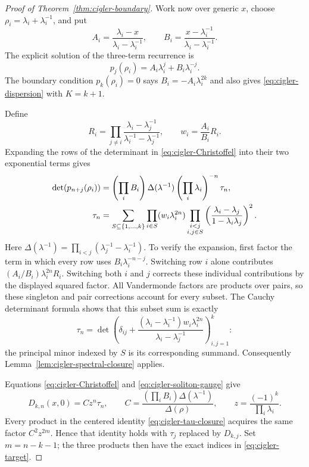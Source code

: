 \documentclass[11pt,a4paper]{article}
\theoremstyle{definition}\newtheorem{definition}[theorem]{Definition}
\theoremstyle{remark}\newtheorem{remark}[theorem]{Remark}
\begin{document}
\begin{proof}[Proof of Theorem~\ref{thm:cigler-boundary}]
Work now over generic $x$, choose
$\rho_i=\lambda_i+\lambda_i^{-1}$, and put
\[
 A_i=\frac{\lambda_i-x}{\lambda_i-\lambda_i^{-1}},\qquad
 B_i=\frac{x-\lambda_i^{-1}}{\lambda_i-\lambda_i^{-1}}.
\]
The explicit solution of the three-term recurrence is
\[
 p_j(\rho_i)=A_i\lambda_i^j+B_i\lambda_i^{-j}.
\]
The boundary condition $p_k(\rho_i)=0$ says
$B_i=-A_i\lambda_i^{2k}$ and also gives
\eqref{eq:cigler-dispersion} with $K=k+1$.

Define
\[
 R_i=\prod_{j\ne i}
       \frac{\lambda_i-\lambda_j^{-1}}
            {\lambda_i^{-1}-\lambda_j^{-1}},
 \qquad w_i=\frac{A_i}{B_i}R_i.
\]
Expanding the rows of the determinant in \eqref{eq:cigler-Christoffel}
into their two exponential terms gives
\begin{align}
 \det(p_{n+j}(\rho_i))
 &=\left(\prod_i B_i\right)\Delta(\lambda^{-1})
                    \left(\prod_i\lambda_i\right)^{-n}\tau_n,
 \label{eq:cigler-soliton-gauge}\\
 \tau_n
 &=\sum_{S\subseteq\{1,\ldots,k\}}
       \prod_{i\in S}(w_i\lambda_i^{2n})
       \prod_{\substack{i<j\\i,j\in S}}
          \left(\frac{\lambda_i-\lambda_j}{1-\lambda_i\lambda_j}\right)^2.
 \notag
\end{align}
Here $\Delta(\lambda^{-1})=\prod_{i<j}(\lambda_j^{-1}-\lambda_i^{-1})$.
To verify the expansion, first factor the term in which every row uses
$B_i\lambda_i^{-n-j}$. Switching row $i$ alone contributes
$(A_i/B_i)\lambda_i^{2n}R_i$. Switching both $i$ and $j$ corrects
these individual contributions by the displayed squared factor.
All Vandermonde factors are products over pairs, so these singleton and
pair corrections account for every subset.
The Cauchy determinant formula shows that this subset sum is exactly
\[
 \tau_n=\det\left(\delta_{ij}
       +\frac{(\lambda_i-\lambda_i^{-1})w_i\lambda_i^{2n}}
                    {\lambda_i-\lambda_j^{-1}}\right)_{i,j=1}^k:
\]
the principal minor indexed by $S$ is its corresponding summand.
Consequently Lemma~\ref{lem:cigler-spectral-closure} applies.

Equations \eqref{eq:cigler-Christoffel} and
\eqref{eq:cigler-soliton-gauge} give
\[
 D_{k,n}(x,0)=Cz^n\tau_n,\qquad
 C=\frac{(\prod_i B_i)\Delta(\lambda^{-1})}{\Delta(\rho)},
 \qquad z=\frac{(-1)^k}{\prod_i\lambda_i}.
\]
Every product in the centered identity
\eqref{eq:cigler-tau-closure} acquires the same factor $C^2z^{2m}$.
Hence that identity holds with $\tau_j$ replaced by $D_{k,j}$.
Set $m=n-k-1$; the three products then have the exact indices in
\eqref{eq:cigler-target}.


\end{proof}
\end{document}
